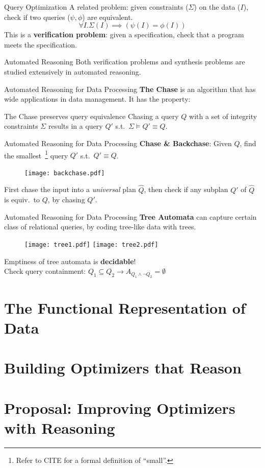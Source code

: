 \documentclass{beamer}
\begin{document}
  \begin{frame}{Query Optimization}
    A related problem: given constraints ($\Sigma$) on the data ($I$), 
    check if two queries ($\psi, \phi$) are equivalent.
    \[\forall I . \Sigma(I) \implies (\psi(I) = \phi(I)) \] \pause
    This is a \textbf{verification problem}:
    given a specification, check that a program meets the specification.
  \end{frame}

  \begin{frame}{Automated Reasoning}
    Both verification problems and synthesis problems are studied 
    extensively in automated reasoning.
  \end{frame}

  \begin{frame}{Automated Reasoning for Data Processing}
    \textbf{The Chase} is an algorithm that has wide applications 
    in data management. It has the property:
    \begin{alertblock}{The Chase preserves query equivalence}
      Chasing a query $Q$ with a set of integrity constraints $\Sigma$
      results in a query $Q'$ s.t.~$\Sigma \models Q'\equiv Q$.
    \end{alertblock}
  \end{frame}

  \begin{frame}{Automated Reasoning for Data Processing}
    \textbf{Chase \& Backchase}: Given $Q$, find the smallest~\footnote{
      Refer to CITE for a formal definition of ``small''.
    }
    query $Q'$ s.t.~$Q'\equiv Q$.
    \begin{figure}
      \texttt{[image: backchase.pdf]}
    \end{figure}
    First chase the input into a {\em universal} plan $\hat Q$, \pause 
    then check if any subplan $Q'$ of $\hat Q$ is equiv.~to $Q$,
    by chasing $Q'$.
  \end{frame}

  \begin{frame}{Automated Reasoning for Data Processing}
    \textbf{Tree Automata} can capture certain class of
    relational queries, by coding tree-like data with trees.
    \begin{figure}
      \colorbox{white}{
      \texttt{[image: tree1.pdf]}
      \hspace{1cm}
      \texttt{[image: tree2.pdf]}}
    \end{figure}
    \pause
    Emptiness of tree automata is \textbf{decidable}! \\
    Check query containment: 
    $Q_1 \subseteq Q_2 \rightarrow A_{Q_1 \wedge \neg Q_2} = \emptyset$
  \end{frame}

  \section{The Functional Representation of Data}
  \section{Building Optimizers that Reason}
  \section{Proposal: Improving Optimizers with Reasoning}
\end{document}
